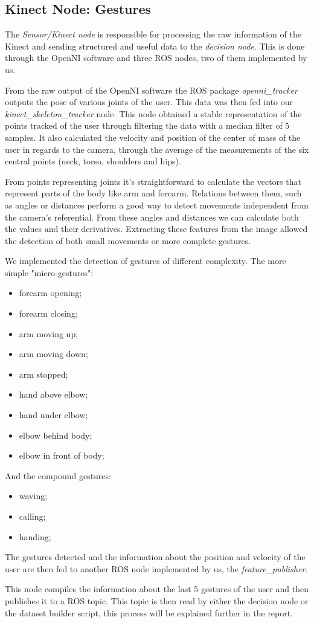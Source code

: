 \subsection{Kinect Node: Gestures}

The \textit{Sensor/Kinect node} is responsible for processing the raw information of the Kinect and sending structured and useful data to the \textit{decision node}. This is done through the OpenNI software and three ROS nodes, two of them implemented by us.  

From the raw output of the OpenNI software the ROS package \textit{openni\_tracker} outputs the pose of various joints of the user. This data was then fed into our \textit{kinect\_skeleton\_tracker} node. This node obtained a stable representation of the points tracked of the user through filtering the data with a median filter of 5 samples. It also calculated the velocity and position of the center of mass of the user in regards to the camera, through the average of the measurements of the six central points (neck, torso, shoulders and hips). 

From points representing joints it's straightforward to calculate the vectors that represent parts of the body like arm and forearm. Relations between them, such as angles or distances perform a good way to detect movements independent from the camera's referential.
From these angles and distances we can calculate both the values and their derivatives. Extracting these features from the image allowed the detection of both small movements or more complete gestures.

We implemented the detection of gestures of different complexity. The more simple "micro-gestures":

\begin{itemize}
\item forearm opening;
\item forearm closing;
\item arm moving up;
\item arm moving down;
\item arm stopped;
\item hand above elbow;
\item hand under elbow;
\item elbow behind body;
\item elbow in front of body;
\end{itemize}

And the compound gestures:
\begin{itemize}
\item waving;
\item calling;
\item handing;
\end{itemize}

The gestures detected and the information about the position and velocity of the user are then fed to another ROS node implemented by us, the \textit{feature\_publisher}.

This node compiles the information about the last 5 gestures of the user and then publishes it to a ROS topic. This topic is then read by either the decision node or the dataset builder script, this process will be explained further in the report.  